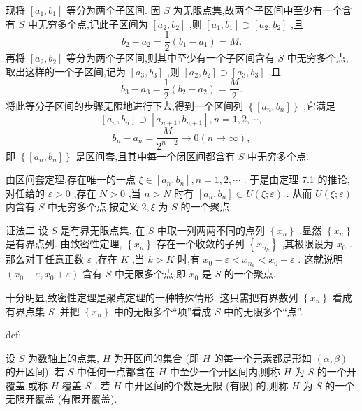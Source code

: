 现将 \(\left\lbrack  {{a}_{1},{b}_{1}}\right\rbrack\) 等分为两个子区间. 因 \(S\) 为无限点集,故两个子区间中至少有一个含有 \(S\) 中无穷多个点,记此子区间为 \(\left\lbrack  {{a}_{2},{b}_{2}}\right\rbrack\) ,则 \(\left\lbrack  {{a}_{1},{b}_{1}}\right\rbrack   \supset  \left\lbrack  {{a}_{2},{b}_{2}}\right\rbrack\) ,且
\[
{b}_{2} - {a}_{2} = \frac{1}{2}\left( {{b}_{1} - {a}_{1}}\right)  = M.
\]
再将 \(\left\lbrack  {{a}_{2},{b}_{2}}\right\rbrack\) 等分为两个子区间,则其中至少有一个子区间含有 \(S\) 中无穷多个点, 取出这样的一个子区间,记为 \(\left\lbrack  {{a}_{3},{b}_{3}}\right\rbrack\) ,则 \(\left\lbrack  {{a}_{2},{b}_{2}}\right\rbrack   \supset  \left\lbrack  {{a}_{3},{b}_{3}}\right\rbrack\) ,且
\[
{b}_{3} - {a}_{3} = \frac{1}{2}\left( {{b}_{2} - {a}_{2}}\right)  = \frac{M}{2}.
\]
将此等分子区间的步骤无限地进行下去,得到一个区间列 \(\left\{  \left\lbrack  {{a}_{n},{b}_{n}}\right\rbrack  \right\}\) ,它满足
\[
\left\lbrack  {{a}_{n},{b}_{n}}\right\rbrack   \supset  \left\lbrack  {{a}_{n + 1},{b}_{n + 1}}\right\rbrack  ,n = 1,2,\cdots ,
\]
\[
{b}_{n} - {a}_{n} = \frac{M}{{2}^{n - 2}} \rightarrow  0\left( {n \rightarrow  \infty }\right) ,
\]
即 \(\left\{  \left\lbrack  {{a}_{n},{b}_{n}}\right\rbrack  \right\}\) 是区间套,且其中每一个闭区间都含有 \(S\) 中无穷多个点.

由区间套定理,存在唯一的一点 \(\xi  \in  \left\lbrack  {{a}_{n},{b}_{n}}\right\rbrack  ,n = 1,2,\cdots\) . 于是由定理 7.1 的推论, 对任给的 \(\varepsilon  > 0\) ,存在 \(N > 0\) ,当 \(n > N\) 时有 \(\left\lbrack  {{a}_{n},{b}_{n}}\right\rbrack   \subset  U\left( {\xi ;\varepsilon }\right)\) . 从而 \(U\left( {\xi ;\varepsilon }\right)\) 内含有 \(S\) 中无穷多个点,按定义 \(2,\xi\) 为 \(S\) 的一个聚点.

证法二 设 \(S\) 是有界无限点集. 在 \(S\) 中取一列两两不同的点列 \(\left\{  {x}_{n}\right\}\) ,显然 \(\left\{  {x}_{n}\right\}\) 是有界点列. 由致密性定理, \(\left\{  {x}_{n}\right\}\) 存在一个收敛的子列 \(\left\{  {x}_{{n}_{k}}\right\}\) ,其极限设为 \({x}_{0}\) . 那么对于任意正数 \(\varepsilon\) ,存在 \(K\) ,当 \(k > K\) 时,有 \({x}_{0} - \varepsilon  < {x}_{{n}_{k}} < {x}_{0} + \varepsilon\) . 这就说明 \(\left( {{x}_{0} - \varepsilon ,{x}_{0} + \varepsilon }\right)\) 含有 \(S\) 中无限多个点,即 \({x}_{0}\) 是 \(S\) 的一个聚点.

十分明显,致密性定理是聚点定理的一种特殊情形. 这只需把有界数列 \(\left\{  {x}_{n}\right\}\) 看成有界点集 \(S\) ,并把 \(\left\{  {x}_{n}\right\}\) 中的无限多个“项”看成 \(S\) 中的无限多个“点”.

\begin{definition}{}{def:}

\end{definition}
设 \(S\) 为数轴上的点集, \(H\) 为开区间的集合 (即 \(H\) 的每一个元素都是形如 \(\left( {\alpha ,\beta }\right)\) 的开区间). 若 \(S\) 中任何一点都含在 \(H\) 中至少一个开区间内,则称 \(H\) 为 \(S\) 的一个开覆盖,或称 \(H\) 覆盖 \(S\) . 若 \(H\) 中开区间的个数是无限 (有限) 的,则称 \(H\) 为 \(S\) 的一个无限开覆盖 (有限开覆盖).


